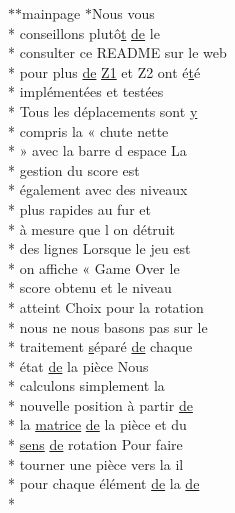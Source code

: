 \begin{DoxyCompactItemize}
\item 
$\ast$$\ast$mainpage $\ast$Nous vous \\*
conseillons plutô\hyperlink{gl_8h_a00140d6f5c548b26daf170bf16e86a6d}{t} \hyperlink{mainpage_8dox_ab37fa35e77d95c6d0d0ab620c97c3db8}{de} le \\*
consulter ce R\-E\-A\-D\-M\-E sur le web \\*
pour plus \hyperlink{mainpage_8dox_ab37fa35e77d95c6d0d0ab620c97c3db8}{de} \hyperlink{mainpage_8dox_ac1b4262bdb6c0693bc375775d6cfa421}{Z1} et Z2 ont é\hyperlink{gl_8h_a00140d6f5c548b26daf170bf16e86a6d}{t}é \\*
implémentées et testées \\*
Tous les déplacements sont \hyperlink{gl_8h_a74d80fd479c0f6d0153c709949a089ef}{y} \\*
compris la « chute nette \\*
» avec la barre d espace La \\*
gestion du score est \\*
également avec des niveaux \\*
plus rapides au fur et \\*
à mesure que l on détruit \\*
des lignes Lorsque le jeu est \\*
on affiche « Game Over le \\*
score obtenu et le niveau \\*
atteint Choix pour la rotation \\*
nous ne nous basons pas sur le \\*
traitement \hyperlink{gl_8h_ad585a1393cfa368fa9dc3d8ebff640d5}{s}éparé \hyperlink{mainpage_8dox_ab37fa35e77d95c6d0d0ab620c97c3db8}{de} chaque \\*
état \hyperlink{mainpage_8dox_ab37fa35e77d95c6d0d0ab620c97c3db8}{de} la pièce Nous \\*
calculons simplement la \\*
nouvelle position à partir \hyperlink{mainpage_8dox_ab37fa35e77d95c6d0d0ab620c97c3db8}{de} \\*
la \hyperlink{mainpage_8dox_af2e36bcdda8980a3e5c1f4013331ee45}{matrice} \hyperlink{mainpage_8dox_ab37fa35e77d95c6d0d0ab620c97c3db8}{de} la pièce et du \\*
\hyperlink{mainpage_8dox_aa08a2c237abaf70493855740d9c5d0c8}{sens} \hyperlink{mainpage_8dox_ab37fa35e77d95c6d0d0ab620c97c3db8}{de} rotation Pour faire \\*
tourner une pièce vers la il \\*
pour chaque élément \hyperlink{mainpage_8dox_ab37fa35e77d95c6d0d0ab620c97c3db8}{de} la \hyperlink{mainpage_8dox_ab37fa35e77d95c6d0d0ab620c97c3db8}{de} \\*
$$
\end{DoxyCompactItemize}
